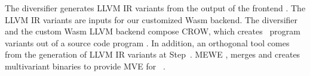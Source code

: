 The diversifier generates LLVM IR variants from the output of the frontend . 
The LLVM IR variants are inputs for our customized Wasm backend. 
The diversifier and the custom Wasm LLVM backend compose CROW, which creates \wasm\ program variants out of a source code program . 
In addition, an orthogonal tool comes from the generation of LLVM IR variants at Step~. MEWE  \cite{MEWE}, merges and creates multivariant binaries to provide MVE for \wasm\ .  



